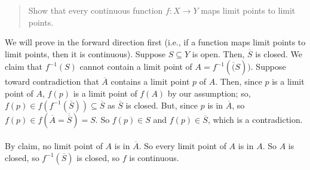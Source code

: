 \documentclass[8pt]{extarticle}
\title{}
\author{Avinash Iyer}
\date{}
\begin{document}
{
  \begin{quote}
    Show that every continuous function $f: X\rightarrow Y$ maps limit points to limit points. 
  \end{quote}
  We will prove in the forward direction first (i.e., if a function maps limit points to limit points, then it is continuous). Suppose $S\subseteq Y$ is open. Then, $\overline{S}$ is closed. We claim that $f^{-1}(S)$ cannot contain a limit point of $A = f^{-1}(\overline(S))$. Suppose toward contradiction that $\overline{A}$ contains a limit point $p$ of $A$. Then, since $p$ is a limit point of $A$, $f(p)$ is a limit point of $f(A)$ by our assumption; so, $f(p)\in f(f^{-1}(\overline{S}))\subseteq \overline{S}$ as $\overline{S}$ is closed. But, since $p$ is in $\overline{A}$, so $f(p)\in f(\overline{A} = \overline{\overline{S}}) = S$. So $f(p)\in S$ and $f(p)\in \overline{S}$, which is a contradiction.\\
  \\
  By claim, no limit point of $A$ is in $\overline{A}$. So every limit point of $A$ is in $A$. So $A$ is closed, so $f^{-1}(\overline{S})$ is closed, so $f$ is continuous.

}
\end{document}
